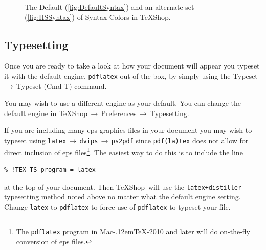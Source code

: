 \documentclass[letterpaper,11pt]{article}
\newcommand{\MacTeX}{Mac\kern-.12em\TeX}
\newcommand{\TS}{\textsf{\TeX Shop}}
\newcommand{\acr}[1]{\textsf{#1}}
\newcommand{\cmd}[1]{\textsf{#1}}
\newcommand{\mnu}[1]{\textsf{#1}}
\newcommand{\To}{\,\(\to\)\,}
\begin{document}
\begin{figure}
\centering
{}%
\qquad%
%
\caption[\TS\ Syntax Colors]{The Default (\ref{fig:DefaultSyntax}) and an alternate set (\ref{fig:HSSyntax}) of Syntax Colors in \TS.}
\label{fig:SyntaxColors}
\end{figure}


\subsection{Typesetting}

Once you are ready to take a look at how your document will appear you typeset it with the default engine, \texttt{pdflatex} out of the box, by simply using the \mnu{Typeset}\To\mnu{Typeset} (\cmd{Cmd-T}) command.

You may wish to use a different engine as your default. You can change the default engine in \mnu{TeXShop}\To\mnu{Preferences}\To\mnu{Typesetting}.

If you are including many \acr{eps} graphics files in your document you may wish to typeset using \texttt{latex}\To\texttt{dvips}\To\texttt{ps2pdf} since \texttt{pdf(la)tex} does not allow for direct inclusion of \acr{eps} files\footnote{The \texttt{pdflatex} program in \MacTeX-2010 and later will do on-the-fly conversion of \acr{eps} files.}. The easiest way to do this is to include the line
\begin{verbatim}
% !TEX TS-program = latex
\end{verbatim}
at the top of your document. Then \TS\ will use the \texttt{latex+distiller} typesetting method noted above no matter what the default engine setting. Change \texttt{latex} to \texttt{pdflatex} to force use of \texttt{pdflatex} to typeset your file.
\end{document}
